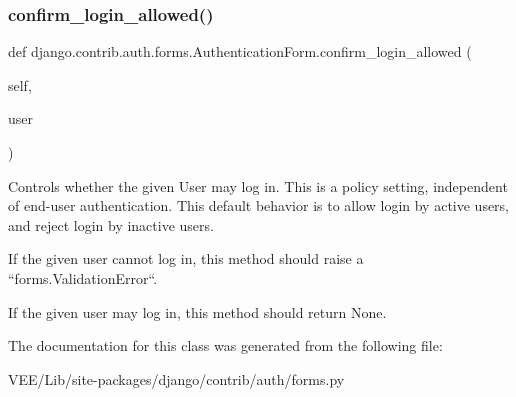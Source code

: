 \subsubsection{\texorpdfstring{confirm\+\_\+login\+\_\+allowed()}{confirm\_login\_allowed()}}
{\footnotesize\ttfamily def django.\+contrib.\+auth.\+forms.\+Authentication\+Form.\+confirm\+\_\+login\+\_\+allowed (\begin{DoxyParamCaption}\item[{}]{self,  }\item[{}]{user }\end{DoxyParamCaption})}

\begin{DoxyVerb}Controls whether the given User may log in. This is a policy setting,
independent of end-user authentication. This default behavior is to
allow login by active users, and reject login by inactive users.

If the given user cannot log in, this method should raise a
``forms.ValidationError``.

If the given user may log in, this method should return None.
\end{DoxyVerb}
 

The documentation for this class was generated from the following file\+:\begin{DoxyCompactItemize}
\item 
V\+E\+E/\+Lib/site-\/packages/django/contrib/auth/forms.\+py\end{DoxyCompactItemize}
